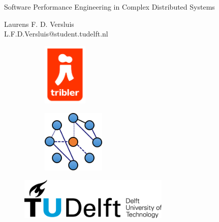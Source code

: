 \begin{titlepage}

\null\vfill

\begin{center}
\LARGE{Software Performance Engineering in Complex Distributed Systems}
\end{center}

\vspace{1.5cm}

\begin{center}
Laurens F. D. Versluis\\
L.F.D.Versluis@student.tudelft.nl
\end{center}

\vfill

\centering
\begin{figure}[!b]
\captionsetup[subfigure]{labelformat=empty}
\begin{subfigure}{0.4\textwidth}
\centering
\includegraphics[height=3cm]{pics/triblerlogo}
\caption{}
\end{subfigure}%
\begin{subfigure}{0.6\textwidth}
\centering
\includegraphics[height=3cm]{pics/dslogo}
\caption{}
\end{subfigure}%
\end{figure}

\begin{figure}[!b]
\centering
\includegraphics[height=2cm]{pics/TUDLogo}
\end{figure}


\vspace{2.0cm}

\end{titlepage}
